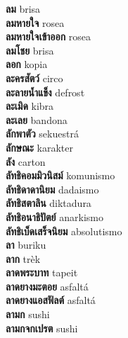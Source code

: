 \textbf{ ลม  } brisa \\
\textbf{ ลมหายใจ  } rosea \\
\textbf{ ลมหายใจเข้าออก  } rosea \\
\textbf{ ลมโชย  } brisa \\
\textbf{ ลอก  } kopia \\
\textbf{ ละครสัตว์  } circo \\
\textbf{ ละลายน้ำแข็ง  } defrost \\
\textbf{ ละเมิด  } kibra \\
\textbf{ ละเลย  } bandona \\
\textbf{ ลักพาตัว  } sekuestrá \\
\textbf{ ลักษณะ  } karakter \\
\textbf{ ลัง  } carton \\
\textbf{ ลัทธิคอมมิวนิสม์  } komunismo \\
\textbf{ ลัทธิดาดานิยม  } dadaismo \\
\textbf{ ลัทธิสตาลิน  } diktadura \\
\textbf{ ลัทธิอนาธิปัตย์  } anarkismo \\
\textbf{ ลัทธิเบ็ดเสร็จนิยม  } absolutismo \\
\textbf{ ลา  } buriku \\
\textbf{ ลาก  } trèk \\
\textbf{ ลาดพระบาท  } tapeit \\
\textbf{ ลาดยางมะตอย  } asfaltá \\
\textbf{ ลาดยางแอสฟัลต์  } asfaltá \\
\textbf{ ลามก  } sushi \\
\textbf{ ลามกจกเปรต  } sushi \\
